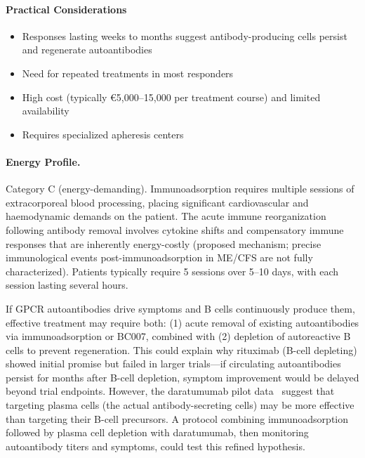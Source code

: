 \paragraph{Practical Considerations}
\begin{itemize}
    \item Responses lasting weeks to months suggest antibody-producing cells persist and regenerate autoantibodies
    \item Need for repeated treatments in most responders
    \item High cost (typically €5,000--15,000 per treatment course) and limited availability
    \item Requires specialized apheresis centers
\end{itemize}

\paragraph{Energy Profile.}
Category C (energy-demanding). Immunoadsorption requires multiple sessions of extracorporeal blood processing, placing significant cardiovascular and haemodynamic demands on the patient. The acute immune reorganization following antibody removal involves cytokine shifts and compensatory immune responses that are inherently energy-costly (proposed mechanism; precise immunological events post-immunoadsorption in ME/CFS are not fully characterized). Patients typically require 5 sessions over 5--10 days, with each session lasting several hours.

\begin{speculation}
If GPCR autoantibodies drive symptoms and B cells continuously produce them, effective treatment may require both: (1) acute removal of existing autoantibodies via immunoadsorption or BC007, combined with (2) depletion of autoreactive B cells to prevent regeneration. This could explain why rituximab (B-cell depleting) showed initial promise but failed in larger trials---if circulating autoantibodies persist for months after B-cell depletion, symptom improvement would be delayed beyond trial endpoints. However, the daratumumab pilot data~\cite{Fluge2025daratumumab} suggest that targeting plasma cells (the actual antibody-secreting cells) may be more effective than targeting their B-cell precursors. A protocol combining immunoadsorption followed by plasma cell depletion with daratumumab, then monitoring autoantibody titers and symptoms, could test this refined hypothesis.
\end{speculation}


